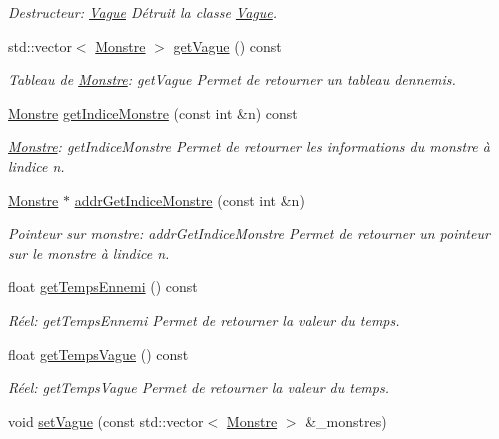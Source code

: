 \begin{DoxyCompactItemize}
\begin{DoxyCompactList}\small\item\em Destructeur\+: \hyperlink{classVague}{Vague} Détruit la classe \hyperlink{classVague}{Vague}. \end{DoxyCompactList}\item 
std\+::vector$<$ \hyperlink{classMonstre}{Monstre} $>$ \hyperlink{classVague_a9a23bacd87181f297f522152adb51c36}{get\+Vague} () const
\begin{DoxyCompactList}\small\item\em Tableau de \hyperlink{classMonstre}{Monstre}\+: get\+Vague Permet de retourner un tableau d\textquotesingle{}ennemis. \end{DoxyCompactList}\item 
\hyperlink{classMonstre}{Monstre} \hyperlink{classVague_af1356b21ff8e2eb3ed40e7c3a0419711}{get\+Indice\+Monstre} (const int \&n) const
\begin{DoxyCompactList}\small\item\em \hyperlink{classMonstre}{Monstre}\+: get\+Indice\+Monstre Permet de retourner les informations du monstre à l\textquotesingle{}indice n. \end{DoxyCompactList}\item 
\hyperlink{classMonstre}{Monstre} $\ast$ \hyperlink{classVague_ab177d208c78c64cb636e3746431a4d16}{addr\+Get\+Indice\+Monstre} (const int \&n)
\begin{DoxyCompactList}\small\item\em Pointeur sur monstre\+: addr\+Get\+Indice\+Monstre Permet de retourner un pointeur sur le monstre à l\textquotesingle{}indice n. \end{DoxyCompactList}\item 
float \hyperlink{classVague_a71f47253f6f4db49d994338a8088985c}{get\+Temps\+Ennemi} () const
\begin{DoxyCompactList}\small\item\em Réel\+: get\+Temps\+Ennemi Permet de retourner la valeur du temps. \end{DoxyCompactList}\item 
float \hyperlink{classVague_af665b6b2ec76931ebb9d5423446cfee8}{get\+Temps\+Vague} () const
\begin{DoxyCompactList}\small\item\em Réel\+: get\+Temps\+Vague Permet de retourner la valeur du temps. \end{DoxyCompactList}\item 
void \hyperlink{classVague_af6bc246e66011691775c3ceb9356ffc8}{set\+Vague} (const std\+::vector$<$ \hyperlink{classMonstre}{Monstre} $>$ \&\+\_\+monstres)

\end{DoxyCompactItemize}
